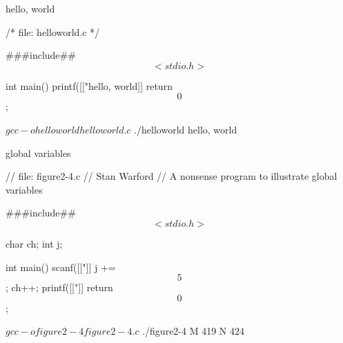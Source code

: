 \documentclass[10pt,t,svgnames]{beamer}
\begin{document}
  \begin{frame}[fragile]{hello, world}
    \begin{codeblock}
    /* file: helloworld.c */

    ###include## $$<stdio.h>$$

    int main() {
      printf([["hello, world]]%
      return $$0$$;
    }
    \end{codeblock}

    \begin{termblock}
    $ gcc -o helloworld helloworld.c
    $ ./helloworld
    hello, world
    \end{termblock}

  \end{frame}

  \begin{frame}[fragile]{global variables}
    \begin{scriptsize}
      \begin{codeblock}
      // file: figure2-4.c
      // Stan Warford
      // A nonsense program to illustrate global variables

      ###include## $$<stdio.h>$$

      char ch;
      int j;

      int main() {
        scanf([["]]%
        j += $$5$$;
        ch++;
        printf([["]]%
        return $$0$$;
      }
      \end{codeblock}
    \end{scriptsize}

    \begin{scriptsize}
      \begin{termblock}
      $ gcc -o figure2-4 figure2-4.c
      $ ./figure2-4
      M 419
      N
      424
      \end{termblock}
    \end{scriptsize}

  \end{frame}
\end{document}
